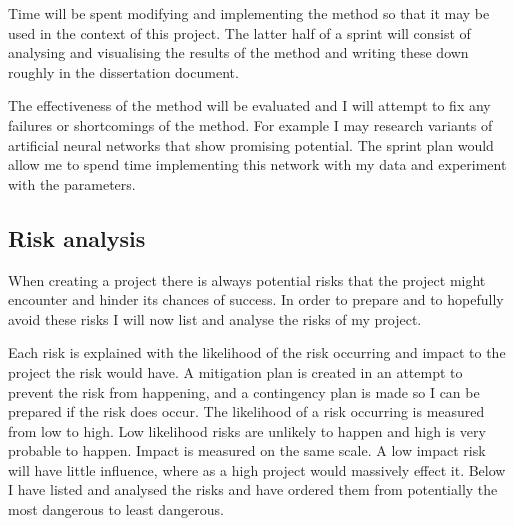 \documentclass{article}
\begin{document}
Time will be spent modifying and implementing the method so that it may be used in the context of this project.
The latter half of a sprint will consist of analysing and visualising the results of the method and writing these down roughly in the dissertation document.

The effectiveness of the method will be evaluated and I will attempt to fix any failures or shortcomings of the method.
For example I may research variants of artificial neural networks that show promising potential.
The sprint plan would allow me to spend time implementing this network with my data and experiment with the parameters.  




\subsection{Risk analysis}
When creating a project there is always potential risks that the project might encounter and hinder its chances of success. 
In order to prepare and to hopefully avoid these risks I will now list and analyse the risks of my project.

Each risk is explained with the likelihood of the risk occurring and impact to the project the risk would have.
A mitigation plan is created in an attempt to prevent the risk from happening, and a contingency plan is made so I can be prepared if the risk does occur.
The likelihood of a risk occurring is measured from low to high.
Low likelihood risks are unlikely to happen and high is very probable to happen. 
Impact is measured on the same scale.
A low impact risk will have little influence, where as a high project would massively effect it.
Below I have listed and analysed the risks and have ordered them from potentially the most dangerous to least dangerous. 

\end{document}
